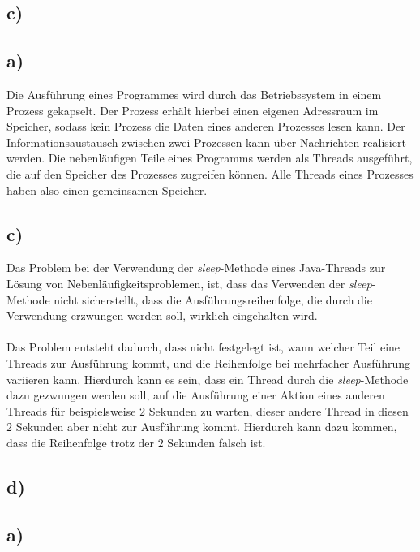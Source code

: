 \documentclass[ngerman]{fbi-aufgabenblatt}
\begin{document}
\setcounter{section}{1}

\subsection*{c)}



\subsection*{a)}
Die Ausführung eines Programmes wird durch das Betriebssystem in einem Prozess gekapselt. Der Prozess erhält hierbei einen eigenen Adressraum im Speicher, sodass kein Prozess die Daten eines anderen Prozesses lesen kann. Der Informationsaustausch zwischen zwei Prozessen kann über Nachrichten realisiert werden. Die nebenläufigen Teile eines Programms werden als Threads ausgeführt, die auf den Speicher des Prozesses zugreifen können. Alle Threads eines Prozesses haben also einen gemeinsamen Speicher.

\subsection*{c)}
Das Problem bei der Verwendung der \textit{sleep}-Methode eines Java-Threads zur Lösung von Nebenläufigkeitsproblemen, ist, dass das Verwenden der \textit{sleep}-Methode nicht sicherstellt, dass die Ausführungsreihenfolge, die durch die Verwendung erzwungen werden soll, wirklich eingehalten wird. \\
\\
Das Problem entsteht dadurch, dass nicht festgelegt ist, wann welcher Teil eine Threads zur Ausführung kommt, und die Reihenfolge bei mehrfacher Ausführung variieren kann. Hierdurch kann es sein, dass ein Thread durch die \textit{sleep}-Methode dazu gezwungen werden soll, auf die Ausführung einer Aktion eines anderen Threads für beispielsweise $2$ Sekunden zu warten, dieser andere Thread in diesen $2$ Sekunden aber nicht zur Ausführung kommt. Hierdurch kann dazu kommen, dass die Reihenfolge trotz der $2$ Sekunden falsch ist.
\subsection*{d)}


\subsection*{a)}
\end{document}
